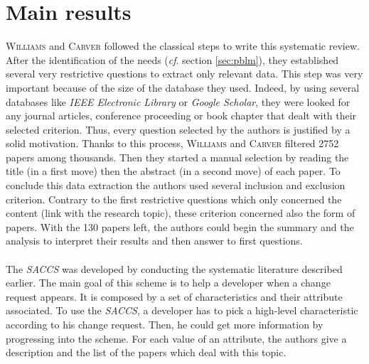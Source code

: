 \documentclass[12pt]{article}
\newcommand{\cf}{\emph{cf}.}
\begin{document}


\section{Main results}\label{sec:res}
\textsc{Williams} and \textsc{Carver} followed the classical steps to write this systematic review. After the identification of the needs (\cf{} section \ref{sec:pblm}), they established several very restrictive questions to extract only relevant data. This step was very important because of the size of the database they used. Indeed, by using several databases like \textit{IEEE Electronic Library} or \textit{Google Scholar}, they were looked for any journal articles, conference proceeding or book chapter that dealt with their selected criterion. Thus, every question selected by the authors is justified by a solid motivation. Thanks to this process, \textsc{Williams} and \textsc{Carver} filtered 2752 papers among thousands. Then they started a manual selection by reading the title (in a first move) then the abstract (in a second move) of each paper. To conclude this data extraction the authors used several inclusion and exclusion criterion. Contrary to the first restrictive questions which only concerned the content (link with the research topic), these criterion concerned also the form of papers. With the 130 papers left, the authors could begin the summary and the analysis to interpret their results and then answer to first questions.

\paragraph{}
The \textit{SACCS} was developed by conducting the systematic literature described earlier. The main goal of this scheme is to help a developer when a change request appears. It is composed by a set of characteristics and their attribute associated. To use the \textit{SACCS}, a developer has to pick a high-level characteristic according to his change request. Then, he could get more information by progressing into the scheme. For each value of an attribute, the authors give a description and the list of the papers which deal with this topic.
\end{document}
